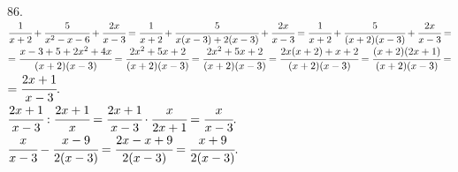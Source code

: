 86. $\cfrac{1}{x+2}+\cfrac{5}{x^2-x-6}+\cfrac{2x}{x-3}=\cfrac{1}{x+2}+\cfrac{5}{x(x-3)+2(x-3)}+\cfrac{2x}{x-3}=
\cfrac{1}{x+2}+\cfrac{5}{(x+2)(x-3)}+\cfrac{2x}{x-3}=$\\$=\cfrac{x-3+5+2x^2+4x}{(x+2)(x-3)}=\cfrac{2x^2+5x+2}{(x+2)(x-3)}=
\cfrac{2x^2+5x+2}{(x+2)(x-3)}=\cfrac{2x(x+2)+x+2}{(x+2)(x-3)}=\cfrac{(x+2)(2x+1)}{(x+2)(x-3)}=$\\$=\cfrac{2x+1}{x-3}.$\\
$\cfrac{2x+1}{x-3}:\cfrac{2x+1}{x}=\cfrac{2x+1}{x-3}\cdot\cfrac{x}{2x+1}=\cfrac{x}{x-3}.$\\
$\cfrac{x}{x-3}-\cfrac{x-9}{2(x-3)}=\cfrac{2x-x+9}{2(x-3)}=\cfrac{x+9}{2(x-3)}.$\\
